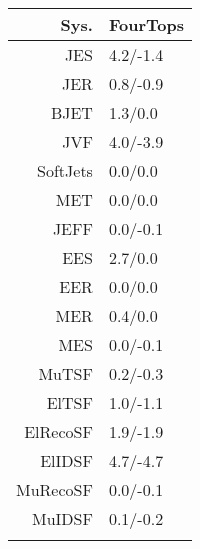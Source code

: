 \begin{tabular}{r|p{.08\linewidth}}
\toprule
 Sys.  & FourTops \\
\toprule
JES  & 4.2/-1.4 \\
JER  & 0.8/-0.9 \\
BJET  & 1.3/0.0 \\
JVF  & 4.0/-3.9 \\
SoftJets  & 0.0/0.0 \\
MET  & 0.0/0.0 \\
JEFF  & 0.0/-0.1 \\
EES  & 2.7/0.0 \\
EER  & 0.0/0.0 \\
MER  & 0.4/0.0 \\
MES  & 0.0/-0.1 \\
MuTSF  & 0.2/-0.3 \\
ElTSF  & 1.0/-1.1 \\
ElRecoSF  & 1.9/-1.9 \\
ElIDSF  & 4.7/-4.7 \\
MuRecoSF  & 0.0/-0.1 \\
MuIDSF  & 0.1/-0.2 \\
 \\
\bottomrule
\end{tabular}
